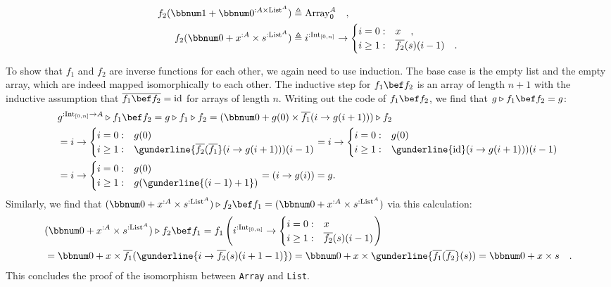 \noindent \vspace{-1.25\baselineskip}
\begin{align*}
f_{2}(\bbnum 1+\bbnum 0^{:A\times\text{List}^{A}}) & \triangleq\text{Array}_{0}^{A}\quad,\\
f_{2}(\bbnum 0+x^{:A}\times s^{:\text{List}^{A}}) & \triangleq i^{:\text{Int}_{[0,n]}}\rightarrow\begin{cases}
i=0: & x\quad,\\
i\geq1: & \overline{f_{2}}(s)(i-1)\quad.
\end{cases}
\end{align*}
\vspace{-0.5\baselineskip}

To show that $f_{1}$ and $f_{2}$ are inverse functions for each
other, we again need to use induction. The base case is the empty
list and the empty array, which are indeed mapped isomorphically to
each other. The inductive step for $f_{1}\bef f_{2}$ is an array
of length $n+1$ with the inductive assumption that $\overline{f_{1}\bef f_{2}}=\text{id}$
for arrays of length $n$. Writing out the code of $f_{1}\bef f_{2}$,
we find that $g\triangleright f_{1}\bef f_{2}=g$:
\begin{align*}
 & g^{:\text{Int}_{[0,n]}\rightarrow A}\triangleright f_{1}\bef f_{2}=g\triangleright f_{1}\triangleright f_{2}=(\bbnum 0+g(0)\times\overline{f_{1}}(i\rightarrow g(i+1)))\triangleright f_{2}\\
 & =i\rightarrow\begin{cases}
i=0: & g(0)\\
i\geq1: & \gunderline{\overline{f_{2}}(\overline{f_{1}}}(i\rightarrow g(i+1)))(i-1)
\end{cases}=i\rightarrow\begin{cases}
i=0: & g(0)\\
i\geq1: & \gunderline{\text{id}}(i\rightarrow g(i+1)))(i-1)
\end{cases}\\
 & =i\rightarrow\begin{cases}
i=0: & g(0)\\
i\geq1: & g(\gunderline{\left(i-1\right)+1})
\end{cases}=\left(i\rightarrow g(i)\right)=g.
\end{align*}
Similarly, we find that $(\bbnum 0+x^{:A}\times s^{:\text{List}^{A}})\triangleright f_{2}\bef f_{1}=(\bbnum 0+x^{:A}\times s^{:\text{List}^{A}})$
via this calculation:
\begin{align*}
 & (\bbnum 0+x^{:A}\times s^{:\text{List}^{A}})\triangleright f_{2}\bef f_{1}=f_{1}\left(i^{:\text{Int}_{[0,n]}}\rightarrow\begin{cases}
i=0: & x\\
i\geq1: & \overline{f_{2}}(s)(i-1)
\end{cases}\right)\\
 & =\bbnum 0+x\times\overline{f_{1}}(\gunderline{i\rightarrow\overline{f_{2}}(s)(i+1-1)})=\bbnum 0+x\times\gunderline{\overline{f_{1}}(\overline{f_{2}}}(s))=\bbnum 0+x\times s\quad.
\end{align*}
This concludes the proof of the isomorphism between \lstinline!Array!
and \lstinline!List!. 

